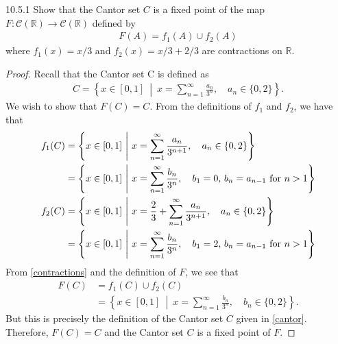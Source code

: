 \begin{problem}{10.5.1}
  Show that the Cantor set $C$ is a fixed point of the map $F: \mathcal{C}(\mathbb{R}) \to \mathcal{C}(\mathbb{R})$
  defined by
  \begin{align*}
    F(A) = f_1(A) \cup f_2(A)
  \end{align*}
  where $f_1(x) = x/3$ and $f_2(x) = x/3 + 2/3$ are contractions on $\mathbb{R}$.
\end{problem}

\begin{proof}
  Recall that the Cantor set C is defined as
  \begin{align}\label{cantor}
    C =\left\{ x\in [0,1]\ \middle|\ x = \sum_{n=1}^\infty \frac{a_n}{3^n}, \quad \text{$a_n \in \{0,2\}$} \right\}.
  \end{align}
  We wish to show that $F(C) = C$. From the definitions of $f_1$ and $f_2$, we have that
  \begin{align}\label{contractions}
    f_1(C)
    &= \left\{ x \in [0, 1]\ \middle|\ x = \sum_{n=1}^\infty \frac{a_n}{3^{n+1}}, \quad \text{$a_n \in \{0,2\}$} \right\} \notag \\
    &= \left\{ x \in [0, 1]\ \middle|\ x = \sum_{n=1}^\infty \frac{b_n}{3^n}, \quad \text{$b_1 = 0$, $b_n = a_{n-1}$ for $n > 1$} \right\} \notag \\
    f_2(C)
    &= \left\{ x \in [0, 1]\ \middle|\ x = \frac{2}{3} + \sum_{n=1}^\infty \frac{a_n}{3^{n+1}},  \quad \text{$a_n \in \{0,2\}$} \right\} \notag \\
    &= \left\{ x \in [0, 1]\ \middle|\ x = \sum_{n=1}^\infty \frac{b_n}{3^n}, \quad \text{$b_1 = 2$, $b_n = a_{n-1}$ for $n > 1$} \right\}
  \end{align}
  From \eqref{contractions} and the definition of $F$, we see that
  \begin{align*}
    F(C) &= f_1(C) \cup f_2(C)\\
    &= \left\{ x \in [0, 1]\ \middle|\ x = \sum_{n=1}^\infty \frac{b_n}{3^n},  \quad \text{$b_n \in \{0,2\}$} \right\}.
  \end{align*}
  But this is precisely the definition of the Cantor set $C$ given in \eqref{cantor}. Therefore, $F(C) = C$ and the Cantor set $C$ is a
  fixed point of $F$.
\end{proof}
\newpage
